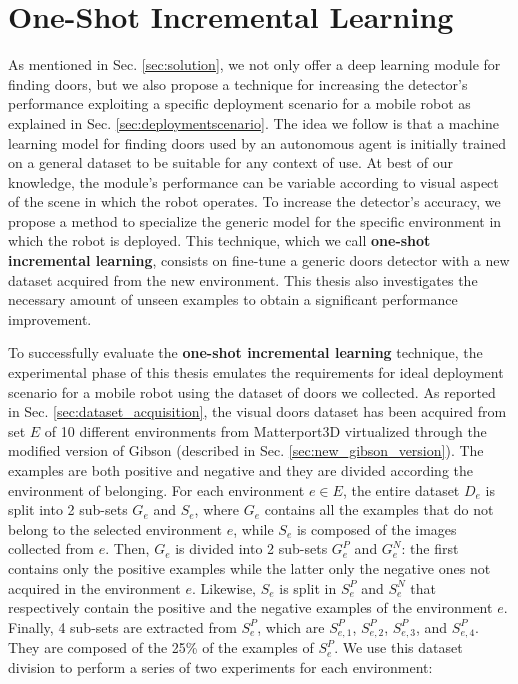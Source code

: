 \section{One-Shot Incremental Learning}

As mentioned in Sec. \ref{sec:solution}, we not only offer a deep learning module for finding doors, but we also propose a technique for increasing the detector's performance exploiting a specific deployment scenario for a mobile robot as  explained in Sec. \ref{sec:deploymentscenario}. The idea we follow is that a machine learning model for finding doors used by an autonomous agent is initially trained on a general dataset to be suitable for any context of use. At best of our knowledge, the module's performance can be variable according to visual aspect of the scene in which the robot operates. To increase the detector's accuracy, we propose a method to specialize the generic model for the specific environment in which the robot is deployed. This technique, which we call \textbf{one-shot incremental learning}, consists on fine-tune a generic doors detector with a new dataset acquired from the new environment. This thesis also investigates the necessary amount of unseen examples to obtain a significant performance improvement.

To successfully evaluate the \textbf{one-shot incremental learning} technique, the experimental phase of this thesis emulates the requirements for ideal deployment scenario for a mobile robot using the dataset of doors we collected. As reported in Sec. \ref{sec:dataset_acquisition}, the visual doors dataset has been acquired from set $E$ of 10 different environments from Matterport3D \cite{matterport} virtualized through the modified version of Gibson \cite{gibson} (described in Sec. \ref{sec:new_gibson_version}). The examples are both positive and negative and they are divided according the environment of belonging. For each environment $e \in E$, the entire dataset $D_{e}$ is split into 2 sub-sets $G_e$ and $S_e$, where $G_e$ contains all the examples that do not belong to the selected environment $e$, while $S_e$ is composed of the images collected from $e$. Then, $G_e$ is divided into 2 sub-sets $G^{P}_e$ and $G^{N}_e$: the first contains only the positive examples while the latter only the negative ones not acquired in the environment $e$. Likewise, $S_e$ is split in $S^{P}_e$ and $S^{N}_e$ that respectively contain the positive and the negative examples of the environment $e$. Finally, 4 sub-sets are extracted from $S^{P}_e$, which are $S^{P}_{e, 1}$, $S^{P}_{e, 2}$, $S^{P}_{e, 3}$, and $S^{P}_{e, 4} $. They are composed of the 25\% of the examples of $S^{P}_e$. We use this dataset division to perform a series of two experiments for each environment:



